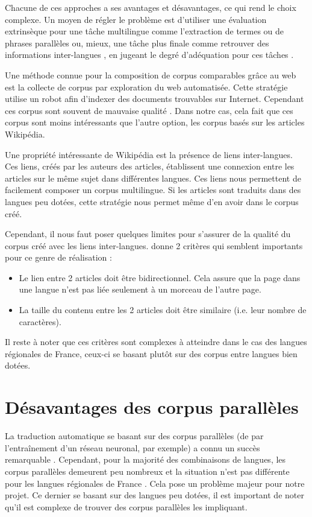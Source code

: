 Chacune de ces approches a ses avantages et désavantages, ce qui rend le choix complexe.
Un moyen de régler le problème est d'utiliser une évaluation extrinsèque pour une tâche multilingue comme
l'extraction de termes ou de phrases parallèles \citep{bel_2013} ou, mieux,
une tâche plus finale comme retrouver des informations inter-langues \citep{li_2012},
en jugeant le degré d'adéquation pour ces tâches \citep{sharoff_2013a}.


Une méthode connue pour la composition de corpus comparables grâce au web est la collecte de corpus par
exploration du web automatisée. Cette stratégie utilise un robot afin d'indexer des documents trouvables
sur Internet. Cependant ces corpus sont souvent de mauvaise qualité \citep{kreutzer_2022, kevers_2021, stosic_2024}.
Dans notre cas, cela fait que ces corpus sont moins intéressants que l'autre option, les corpus basés
sur les articles Wikipédia.

Une propriété intéressante de Wikipédia est la présence de liens inter-langues. Ces liens, créés par les auteurs des
articles, établissent une con\-nexion entre les articles sur le même sujet dans différentes langues. Ces liens
nous permettent de facilement composer un corpus multilingue. Si les articles sont traduits dans des langues
peu dotées, cette stratégie nous permet même d'en avoir dans le corpus créé.

Cependant, il nous faut poser quelques limites pour s'assurer de la qualité du corpus créé avec
les liens inter-langues. \citet{sharoff_2016} donne 2 critères qui semblent importants pour ce genre
de réalisation{ :}
\begin{itemize}
\item Le lien entre 2 articles doit être bidirectionnel. Cela assure que la page dans une langue n'est pas
liée seulement à un morceau de l'autre page.
\item La taille du contenu entre les 2 articles doit être similaire (i.e. leur nom\-bre de caractères).
\end{itemize}
Il reste à noter que ces critères sont complexes à atteindre dans le cas des langues régionales de France,
ceux-ci se basant plutôt sur des corpus entre langues bien dotées.

\section{Désavantages des corpus parallèles} \label{désavantage}

La traduction automatique se basant sur des corpus parallèles (de par l'entraînement d'un réseau neuronal,
par exemple) a connu un succès remarquable \citep{sharoff_2016}.
Cependant, pour la majorité des combinaisons de langues, les corpus parallèles demeurent peu nombreux
\citep{haddow_2022} et la situation n'est pas différente pour les langues régionales de France \citep{stosic_2024}.
Cela pose un problème majeur pour notre projet. Ce dernier se basant sur des langues peu dotées, il est
important de noter qu'il est complexe de trouver des corpus parallèles les impliquant.

